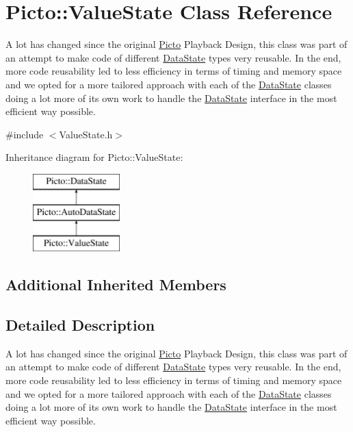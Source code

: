\hypertarget{class_picto_1_1_value_state}{\section{Picto\-:\-:Value\-State Class Reference}
\label{class_picto_1_1_value_state}
}


A lot has changed since the original \hyperlink{namespace_picto}{Picto} Playback Design, this class was part of an attempt to make code of different \hyperlink{class_picto_1_1_data_state}{Data\-State} types very reusable. In the end, more code reusability led to less efficiency in terms of timing and memory space and we opted for a more tailored approach with each of the \hyperlink{class_picto_1_1_data_state}{Data\-State} classes doing a lot more of its own work to handle the \hyperlink{class_picto_1_1_data_state}{Data\-State} interface in the most efficient way possible.  




{\ttfamily \#include $<$Value\-State.\-h$>$}

Inheritance diagram for Picto\-:\-:Value\-State\-:\begin{figure}[H]
\begin{center}
\leavevmode
\includegraphics[height=3.000000cm]{class_picto_1_1_value_state}
\end{center}
\end{figure}
\subsection*{Additional Inherited Members}


\subsection{Detailed Description}
A lot has changed since the original \hyperlink{namespace_picto}{Picto} Playback Design, this class was part of an attempt to make code of different \hyperlink{class_picto_1_1_data_state}{Data\-State} types very reusable. In the end, more code reusability led to less efficiency in terms of timing and memory space and we opted for a more tailored approach with each of the \hyperlink{class_picto_1_1_data_state}{Data\-State} classes doing a lot more of its own work to handle the \hyperlink{class_picto_1_1_data_state}{Data\-State} interface in the most efficient way possible. 

